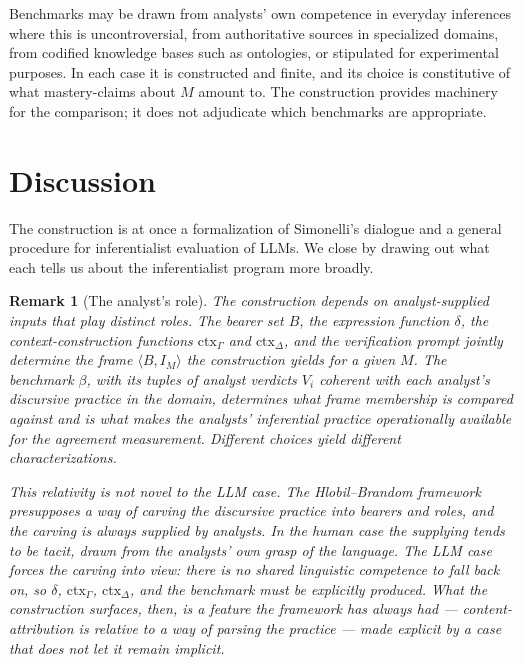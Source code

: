 \documentclass[11pt]{article}
\newtheorem{remark}{Remark}
\begin{document}
Benchmarks may be drawn from analysts' own competence in everyday inferences where this is uncontroversial, from authoritative sources in specialized domains, from codified knowledge bases such as ontologies, or stipulated for experimental purposes. In each case it is constructed and finite, and its choice is constitutive of what mastery-claims about $M$ amount to. The construction provides machinery for the comparison; it does not adjudicate which benchmarks are appropriate.

\section{Discussion}

The construction is at once a formalization of Simonelli's dialogue and a general procedure for inferentialist evaluation of LLMs. We close by drawing out what each tells us about the inferentialist program more broadly.

\begin{remark}[The analyst's role]
\label{rem:analyst}
The construction depends on analyst-supplied inputs that play distinct roles. The bearer set $B$, the expression function $\delta$, the context-construction functions $\mathrm{ctx}_\Gamma$ and $\mathrm{ctx}_\Delta$, and the verification prompt jointly determine the frame $\langle B, I_M \rangle$ the construction yields for a given $M$. The benchmark $\beta$, with its tuples of analyst verdicts $V_i$ coherent with each analyst's discursive practice in the domain, determines what frame membership is compared against and is what makes the analysts' inferential practice operationally available for the agreement measurement. Different choices yield different characterizations.

This relativity is not novel to the LLM case. The Hlobil--Brandom framework presupposes a way of carving the discursive practice into bearers and roles, and the carving is always supplied by analysts. In the human case the supplying tends to be tacit, drawn from the analysts' own grasp of the language. The LLM case forces the carving into view: there is no shared linguistic competence to fall back on, so $\delta$, $\mathrm{ctx}_\Gamma$, $\mathrm{ctx}_\Delta$, and the benchmark must be explicitly produced. What the construction surfaces, then, is a feature the framework has always had --- content-attribution is relative to a way of parsing the practice --- made explicit by a case that does not let it remain implicit.
\end{remark}
\end{document}
